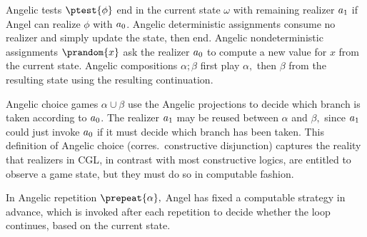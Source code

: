 \documentclass[12pt]{cmuthesis}
\theoremstyle{definition}
\theoremstyle{remark}
\newcommand{\om}{\omega}
\newcommand{\CGL}{\textsf{CGL}\xspace}
\begin{document}
Angelic tests $\ptest{\phi}$ end in the current state $\om$ with remaining realizer $a_1$ if Angel can realize $\phi$ with $a_0$.
Angelic deterministic assignments consume no realizer and simply update the state, then end.
Angelic nondeterministic assignments $\prandom{x}$ ask the realizer $a_0$ to compute a new value for $x$ from the current state.
Angelic compositions $\alpha;\beta$ first play $\alpha,$ then $\beta$ from the resulting state using the resulting continuation.

Angelic choice games $\alpha \cup \beta$ use the Angelic projections to decide which branch is taken according to $a_0$.
The realizer $a_1$ may be reused between $\alpha$ and $\beta,$ since $a_1$ could just invoke $a_0$ if it must decide which branch has been taken.
This definition of Angelic choice (corres.\ constructive disjunction) captures the reality that realizers in \CGL, in contrast with most constructive logics, are entitled to observe a game state, but they must do so in computable fashion.

In Angelic repetition $\prepeat{\alpha},$ Angel has fixed a computable strategy in advance, which is invoked after each repetition to decide whether the loop continues, based on the current state.
\end{document}
